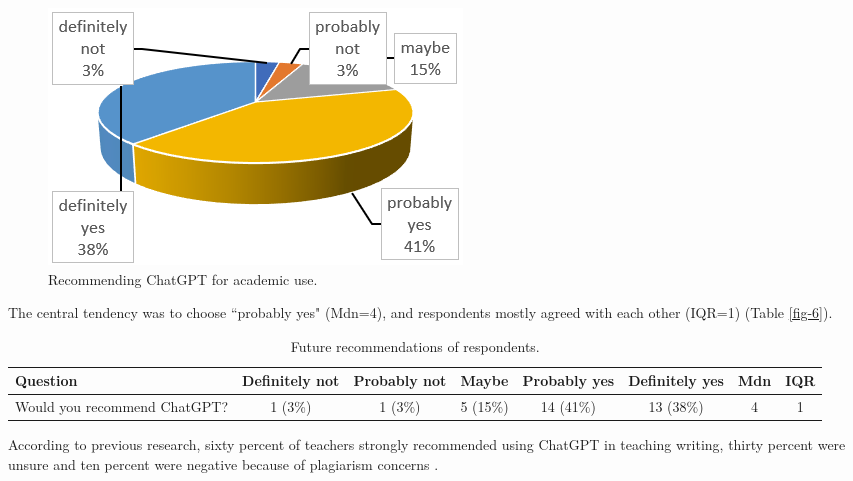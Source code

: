 \documentclass[english]{textolivre}
\begin{document}
\begin{figure}[h!]
    \centering
    \begin{minipage}{0.65\linewidth}
    \includegraphics[width=\linewidth]{Imagens/Figure10.png}
    \caption{Recommending ChatGPT for academic use.}
    \label{fig-10}
    \end{minipage}
\end{figure}

The central tendency was to choose ``probably yes" (Mdn=4), and respondents mostly agreed with each other (IQR=1) (Table \ref{fig-6}).

\begin{table}[h!]
\centering
\caption{Future recommendations of respondents.}\label{tab-6}
\begin{tabularx}{\textwidth}{@{}Xccccc cc@{}}
\toprule
Question & Definitely not & Probably not & Maybe & Probably yes & Definitely yes & Mdn & IQR \\
\midrule
Would you recommend ChatGPT? & 1 (3\%) & 1 (3\%) & 5 (15\%) & 14 (41\%) & 13 (38\%) & 4 & 1 \\
\bottomrule
\end{tabularx}
\end{table}


According to previous research, sixty percent of teachers strongly recommended using ChatGPT in teaching writing, thirty percent were unsure and ten percent were negative because of plagiarism concerns \cite[p. 331-332]{nguyen2023}.
\end{document}
